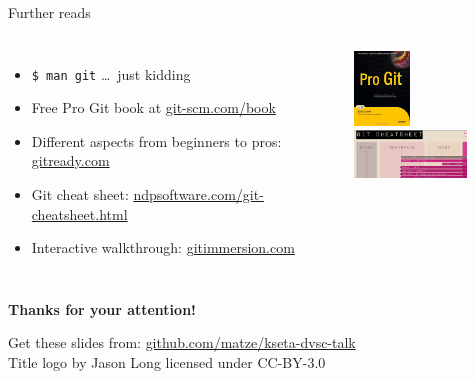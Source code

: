\documentclass[18pt,mathserif]{beamer}
\begin{document}
\begin{frame}{Further reads}
  \begin{columns}[T,onlytextwidth]
      \begin{itemize}
        \item \texttt{\$ man git} \ldots\  just kidding
        \item Free Pro Git book at \url{git-scm.com/book}
        \item Different aspects from beginners to pros: \url{gitready.com}
        \item Git cheat sheet: \url{ndpsoftware.com/git-cheatsheet.html}
        \item Interactive walkthrough: \url{gitimmersion.com}
      \end{itemize}

      \centering
      \includegraphics[width=1.5cm]{images/pro-git}
      \vspace{2em}
      \includegraphics[width=3cm]{images/gcs}
  \end{columns}
\end{frame}
\begin{frame}{}
  \vfill
  \begin{center}
    \huge\bfseries
    \textcolor{KITblack}{Thanks for your attention!}
  \end{center}

  \vfill
  Get these slides from: \url{github.com/matze/kseta-dvsc-talk}\\
  Title logo by Jason Long licensed under CC-BY-3.0
\end{frame}
\end{document}
